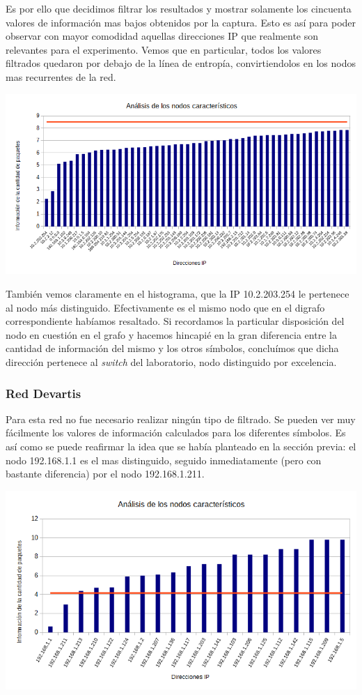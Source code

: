 Es por ello que decidimos filtrar los resultados y mostrar solamente los cincuenta valores de información mas bajos obtenidos por la captura. Esto es así para poder observar con mayor comodidad aquellas direcciones IP que realmente son relevantes para el experimento. Vemos que en particular, todos los valores filtrados quedaron por debajo de la línea de entropía, convirtiendolos en los nodos mas recurrentes de la red.

\centerline{\includegraphics[width=1\textwidth]{./graficos/paquetesVSIP/labo5.png}}

También vemos claramente en el histograma, que la IP 10.2.203.254 le pertenece al nodo más distinguido. Efectivamente es el mismo nodo que en el digrafo correspondiente habíamos resaltado. Si recordamos la particular disposición del nodo en cuestión en el grafo y hacemos hincapié en la gran diferencia entre la cantidad de información del mismo y los otros símbolos, concluímos que dicha dirección pertenece al \textit{switch} del laboratorio, nodo distinguido por excelencia.

\subsubsection{Red Devartis}

Para esta red no fue necesario realizar ningún tipo de filtrado. Se pueden ver muy fácilmente los valores de información calculados para los diferentes símbolos. Es así como se puede reafirmar la idea que se había planteado en la sección previa: el nodo 192.168.1.1 es el mas distinguido, seguido inmediatamente (pero con bastante diferencia) por el nodo 192.168.1.211.

\centerline{\includegraphics[width=1\textwidth]{./graficos/paquetesVSIP/laburo_mari.png}}

